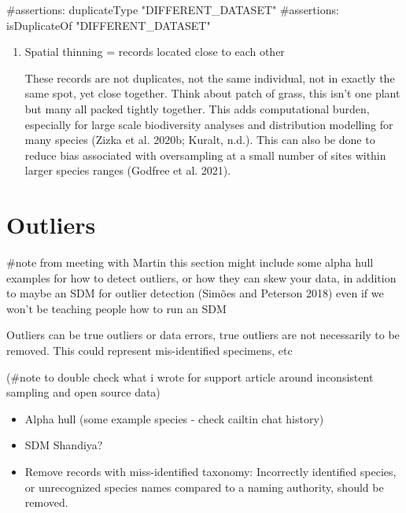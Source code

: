 \documentclass[
  letterpaper,
  DIV=11,
  numbers=noendperiod,
  oneside]{scrreprt}
\newenvironment{Shaded}{\begin{snugshade}}{\end{snugshade}}
\newcommand{\CommentTok}[1]{\textcolor[rgb]{0.37,0.37,0.37}{#1}}
\begin{document}
\begin{Shaded}
\begin{Highlighting}[]
\CommentTok{\#assertions: duplicateType "DIFFERENT\_DATASET"}
\CommentTok{\#assertions: isDuplicateOf "DIFFERENT\_DATASET"}
\end{Highlighting}
\end{Shaded}

\begin{enumerate}
\def\labelenumi{\arabic{enumi}.}
\setcounter{enumi}{2}
\item
  Spatial thinning = records located close to each other

  These records are not duplicates, not the same individual, not in
  exactly the same spot, yet close together. Think about patch of grass,
  this isn't one plant but many all packed tightly together. This adds
  computational burden, especially for large scale biodiversity analyses
  and distribution modelling for many species (Zizka et al. 2020b;
  Kuralt, n.d.). This can also be done to reduce bias associated with
  oversampling at a small number of sites within larger species ranges
  (Godfree et al. 2021).
\end{enumerate}


\hypertarget{outliers}{%
\chapter{Outliers}\label{outliers}}

\#note from meeting with Martin this section might include some alpha
hull examples for how to detect outliers, or how they can skew your
data, in addition to maybe an SDM for outlier detection (Simões and
Peterson 2018) even if we won't be teaching people how to run an SDM

Outliers can be true outliers or data errors, true outliers are not
necessarily to be removed. This could represent mis-identified
specimens, etc

(\#note to double check what i wrote for support article around
inconsistent sampling and open source data)

\begin{itemize}
\item
  Alpha hull (some example species - check cailtin chat history)
\item
  SDM Shandiya?
\item
  Remove records with miss-identified taxonomy: Incorrectly identified
  species, or unrecognized species names compared to a naming authority,
  should be removed.
\end{itemize}
\end{document}
